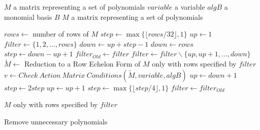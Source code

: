 \begin{algorithm}[!ht]
  \begin{algorithmic}[1]
    \Require
      \Statex $M$ a matrix representing a set of polynomials
      \Statex $variable$ a variable
      \Statex $algB$ a monomial basis $B$
    \Ensure
      \Statex $M$ a matrix representing a set of polynomials
      \Statex

      \State $rows \gets$ number of rows of $M$
      \State $step \gets \max\{\lfloor rows/32\rfloor, 1\}$ 
      \State $up \gets 1$
      \State $filter \gets \{1,2,\dots,rows\}$
        \State $down \gets up + step - 1$
          \State $down \gets rows$
	  \State $step \gets down - up + 1$
	\EndIf
	\State $filter_{Old} \gets filter$
	\State $filter \gets filter \backslash \{up, up+1, \dots, down\}$
	\State $\tilde{M} \gets$ Reduction to a Row Echelon Form of $M$ only with rows specified by $filter$
        \State $v \gets Check\ Action\ Matrix\ Conditions(\tilde{M}, variable, algB)$
          \State $up \gets down + 1$
	  \State $step \gets 2 step$
	\Else
	    \State $up \gets up + 1$
	  \Else
            \State $step \gets \max\{\lfloor step/4\rfloor, 1\}$
	  \EndIf
	  \State $filter \gets filter_{Old}$
	\EndIf
      \EndWhile

      \State \Return $M$ only with rows specified by $filter$
  \end{algorithmic}
  \caption{Remove unnecessary polynomials}
  \label{alg:removeUn}
\end{algorithm}


